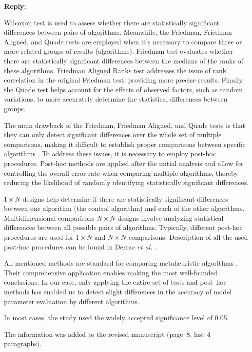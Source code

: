 \documentclass[a4paper,fleqn]{cas-sc}
\begin{document}
\noindent
\textcolor[rgb]{0.51,0.00,0.00}{\textbf{Reply:}}

Wilcoxon test is used to assess whether there are statistically significant differences between pairs of algorithms.
Meanwhile, the Friedman, Friedman Aligned, and Quade tests are employed when it's necessary to compare three or more related groups of results (algorithms).
Friedman test evaluates whether there are statistically significant differences between the medians of the ranks of these algorithms.
Friedman Aligned Ranks test addresses the issue of rank correlation in the original Friedman test, providing more precise results.
Finally, the Quade test helps account for the effects of observed factors, such as random variations,
to more accurately determine the statistical differences between groups.

The main drawback of the Friedman, Friedman Aligned, and Quade tests is that
they can only detect significant differences over the whole set of multiple comparisons,
making it difficult to establish proper comparisons between specific algorithms \cite{Derrac2011}.
To address these issues, it is necessary to employ post-hoc procedures.
Post-hoc methods are applied after the initial analysis and allow for controlling the overall error rate
when comparing multiple algorithms, thereby reducing the likelihood of randomly identifying statistically significant differences.

$1\times N$ designs help determine if there are statistically significant differences between one algorithm
(the control algorithm) and each of the other algorithms.
Multidimensional comparisons $N\times N$ designs involve analyzing statistical differences between all possible pairs of algorithms.
Typically, different post-hoc procedures are used for $1\times N$ and $N\times N$ comparisons.
Description of all the used post-hoc procedures can be found in Derrac \emph{et al.} \cite{Derrac2011}.

All mentioned methods are standard for comparing metaheuristic algorithms \cite{Derrac2011}.
Their comprehensive application enables making the most well-founded conclusions.
In our case, only applying the entire set of tests and post--hoc methods
has enabled us to detect slight differences in the accuracy of model parameter evaluation by different algorithms.

In most cases, the study used the widely accepted significance level of 0.05.

The information was added to the revised manuscript (page~8, last 4 paragraphs).
\end{document}
